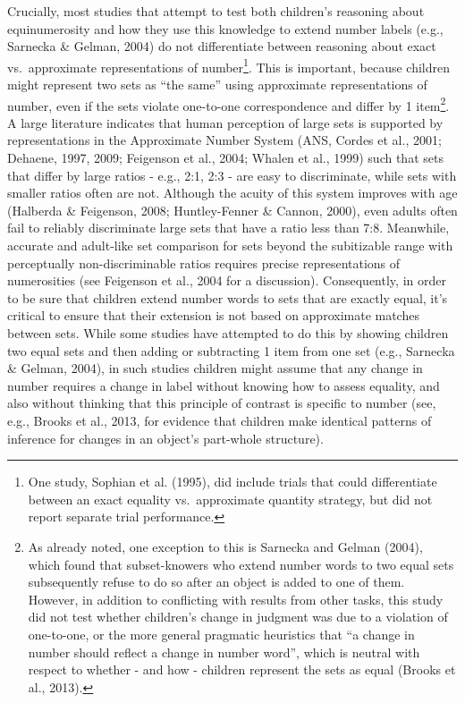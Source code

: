 \documentclass[
  man,floatsintext]{apa7}
\begin{document}
Crucially, most studies that attempt to test both children's reasoning about equinumerosity and how they use this knowledge to extend number labels (e.g., Sarnecka \& Gelman, 2004) do not differentiate between reasoning about exact vs.~approximate representations of number\footnote{One study, Sophian et al. (1995), did include trials that could differentiate between an exact equality vs.~approximate quantity strategy, but did not report separate trial performance.}. This is important, because children might represent two sets as ``the same'' using approximate representations of number, even if the sets violate one-to-one correspondence and differ by 1 item\footnote{As already noted, one exception to this is Sarnecka and Gelman (2004), which found that subset-knowers who extend number words to two equal sets subsequently refuse to do so after an object is added to one of them. However, in addition to conflicting with results from other tasks, this study did not test whether children's change in judgment was due to a violation of one-to-one, or the more general pragmatic heuristics that ``a change in number should reflect a change in number word'', which is neutral with respect to whether - and how - children represent the sets as equal (Brooks et al., 2013).}. A large literature indicates that human perception of large sets is supported by representations in the Approximate Number System (ANS, Cordes et al., 2001; Dehaene, 1997, 2009; Feigenson et al., 2004; Whalen et al., 1999) such that sets that differ by large ratios - e.g., 2:1, 2:3 - are easy to discriminate, while sets with smaller ratios often are not. Although the acuity of this system improves with age (Halberda \& Feigenson, 2008; Huntley-Fenner \& Cannon, 2000), even adults often fail to reliably discriminate large sets that have a ratio less than 7:8. Meanwhile, accurate and adult-like set comparison for sets beyond the subitizable range with perceptually non-discriminable ratios requires precise representations of numerosities (see Feigenson et al., 2004 for a discussion). Consequently, in order to be sure that children extend number words to sets that are exactly equal, it's critical to ensure that their extension is not based on approximate matches between sets. While some studies have attempted to do this by showing children two equal sets and then adding or subtracting 1 item from one set (e.g., Sarnecka \& Gelman, 2004), in such studies children might assume that any change in number requires a change in label without knowing how to assess equality, and also without thinking that this principle of contrast is specific to number (see, e.g., Brooks et al., 2013, for evidence that children make identical patterns of inference for changes in an object's part-whole structure).
\end{document}
